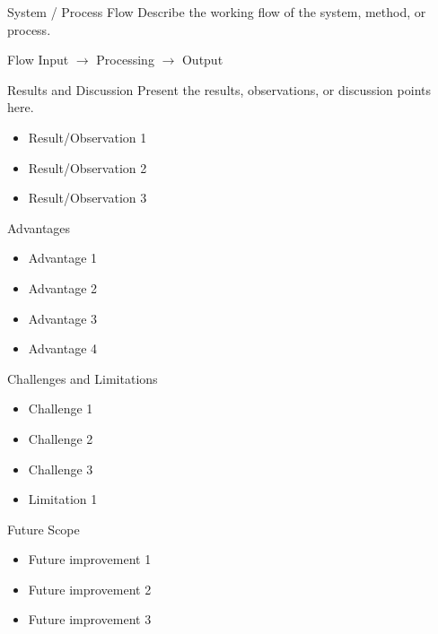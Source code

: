 \documentclass{beamer}
\begin{document}
\begin{frame}{System / Process Flow}
Describe the working flow of the system, method, or process.

\vspace{0.4cm}

\begin{block}{Flow}
Input $\rightarrow$ Processing $\rightarrow$ Output
\end{block}
\end{frame}

\begin{frame}{Results and Discussion}
Present the results, observations, or discussion points here.

\vspace{0.4cm}

\begin{itemize}
\item Result/Observation 1
\item Result/Observation 2
\item Result/Observation 3
\end{itemize}
\end{frame}

\begin{frame}{Advantages}
\begin{itemize}
\item Advantage 1
\item Advantage 2
\item Advantage 3
\item Advantage 4
\end{itemize}
\end{frame}

\begin{frame}{Challenges and Limitations}
\begin{itemize}
\item Challenge 1
\item Challenge 2
\item Challenge 3
\item Limitation 1
\end{itemize}
\end{frame}

\begin{frame}{Future Scope}
\begin{itemize}
\item Future improvement 1
\item Future improvement 2
\item Future improvement 3
\end{itemize}
\end{frame}
\end{document}
